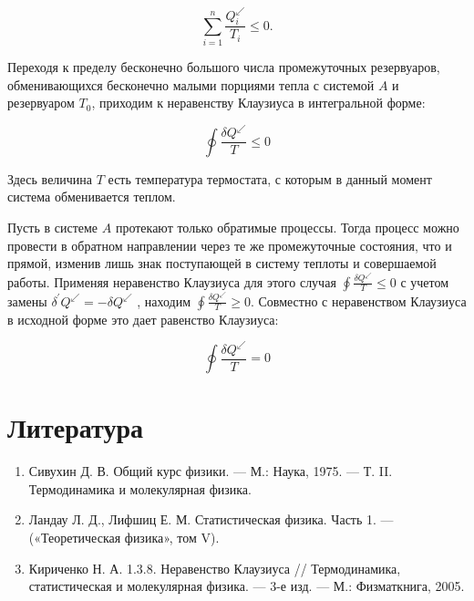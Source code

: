 \documentclass[a4paper,14pt]{article} %
\begin{document}
\begin{equation*}
\sum_{i=1}^{n} \frac{Q_{i}^{\swarrow}}{T_{i}} \leqslant 0.
\end{equation*}

Переходя к пределу бесконечно большого числа промежуточных резервуаров, обменивающихся бесконечно малыми порциями тепла с системой $A$ и резервуаром $T_0$, приходим к неравенству Клаузиуса в интегральной форме:

\begin{equation*}
\oint \frac{\delta Q^{\swarrow}}{T} \leqslant 0
\end{equation*}

Здесь величина $T$ есть температура термостата, с которым в данный
момент система обменивается теплом.

Пусть в системе $A$ протекают только обратимые процессы. Тогда процесс можно провести в обратном направлении через те же промежуточные состояния, что и прямой, изменив лишь знак поступающей в систему теплоты и совершаемой работы. Применяя неравенство Клаузиуса
для этого случая $\oint \frac{\delta Q^{\swarrow}}{T} \leqslant 0$ с учетом замены $\delta^{\prime} Q^{\swarrow}= - \delta Q^{\swarrow}$ , находим $\oint \frac{\delta Q^{\swarrow}}{T} \geqslant 0$. Совместно с неравенством Клаузиуса в исходной форме это
дает равенство Клаузиуса:

\begin{equation*}
\oint \frac{\delta Q^{\swarrow}}{T}=0
\end{equation*}

\section{Литература}

\begin{enumerate}
\item Сивухин Д. В. Общий курс физики. — М.: Наука, 1975. — Т. II. Термодинамика и молекулярная физика.

\item Ландау Л. Д., Лифшиц Е. М. Статистическая физика. Часть 1. — («Теоретическая физика», том V).

\item Кириченко Н. А. 1.3.8. Неравенство Клаузиуса // Термодинамика, статистическая и молекулярная физика. — 3-е изд. — М.: Физматкнига, 2005.
\end{enumerate}
\end{document}
